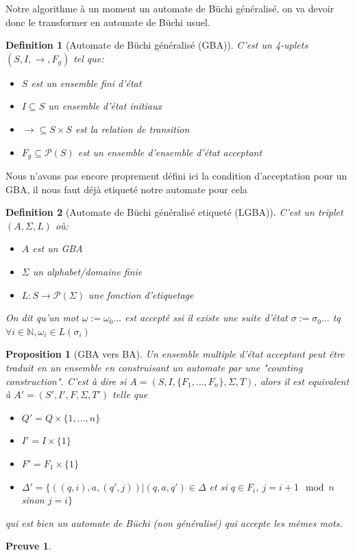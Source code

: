 \documentclass{paper}
\newtheorem{proposition}{Proposition}
\newtheorem{definition}{Definition}
\newtheorem{preuve}{Preuve}
\begin{document}
    Notre algorithme à un moment un automate de Büchi généralisé, on va devoir donc le transformer en automate de Büchi usuel.
    \begin{definition}[Automate de Büchi généralisé (GBA)]
        C'est un 4-uplets $(S, I, \rightarrow, F_g)$ tel que:
        \begin{itemize}
            \item $S$ est un ensemble fini d'état
            \item $I\subseteq S$ un ensemble d'état initiaux
            \item $\rightarrow\subseteq S\times S$ est la relation de transition
            \item $F_g\subseteq \mathcal{P}(S)$ est un ensemble d'ensemble d'état acceptant
        \end{itemize}
    \end{definition}
    Nous n'avons pas encore proprement défini ici la condition d'acceptation pour un GBA, il nous faut déjà etiqueté notre automate pour cela
    \begin{definition}[Automate de Büchi généralisé etiqueté (LGBA)]
        C'est un triplet $(A, \Sigma, L)$ où:
        \begin{itemize}
            \item $A$ est un GBA
            \item $\Sigma$ un alphabet/domaine finie
            \item $L: S \rightarrow \mathcal{P}(\Sigma)$ une fonction d'etiquetage
        \end{itemize}
        On dit qu'un mot $\omega := \omega_0\dots$ est accepté ssi il existe une suite d'état $\sigma := \sigma_0\dots$ tq $\forall i\in\mathbb{N}, \omega_i\in L(\sigma_i)$
    \end{definition}

    \begin{proposition}[GBA vers BA]
        Un ensemble multiple d'état acceptant peut être traduit en un ensemble en construisant un automate par une "counting construction". 
        C'est à dire si $A = (S,I, \{F_1,\dots,F_n\}, \Sigma, T)$, alors il est equivalent à $A' = (S',I', F, \Sigma, T')$ telle que
        \begin{itemize}
            \item $Q' = Q\times\{1,...,n\}$
            \item $I' = I\times\{1\}$
            \item $F'=F_1\times \{1\}$
            \item $\Delta' = \{ ( (q,i), a, (q',j) ) | (q,a,q') \in \Delta$ et si $q \in F_i$, $j= i+1 \mod n$ sinon $j=i \}$
        \end{itemize}
        qui est bien un automate de Büchi (non généralisé) qui accepte les mêmes mots.
    \end{proposition}
    \begin{preuve}
        
    \end{preuve}
\end{document}
